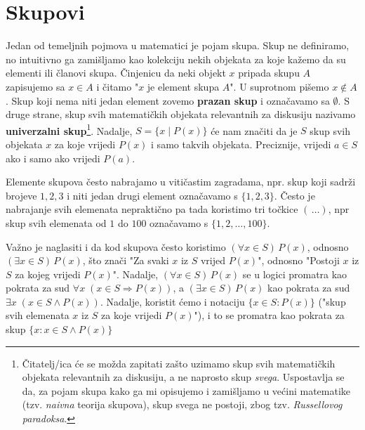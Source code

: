 \section{Skupovi}
Jedan od temeljnih pojmova u matematici je pojam skupa. Skup ne
definiramo, no intuitivno ga zamišljamo kao kolekciju nekih objekata
za koje kažemo da su elementi ili članovi skupa.
Činjenicu da neki objekt $x$ pripada skupu $A$ zapisujemo sa $x\in A$
i čitamo "$x$ je element skupa $A$". U suprotnom pišemo $x\notin A$.
Skup koji nema niti jedan element zovemo \textbf{prazan skup} i označavamo sa $\emptyset$. S druge strane, skup svih matematičkih objekata relevantnih za diskusiju nazivamo \textbf{univerzalni skup}\footnote{Čitatelj/ica će se možda zapitati zašto uzimamo skup svih matematičkih objekata relevantnih za diskusiju, a ne naprosto skup \textit{svega}. Uspostavlja se da, za pojam skupa kako ga mi opisujemo i zamišljamo u većini matematike (tzv. \textit{naivna} teorija skupova), skup svega ne postoji, zbog tzv. \textit{Russellovog paradoksa}.}. Nadalje, $S=\{x\; |\; P(x)\}$ će nam značiti da je $S$ skup svih objekata $x$ za koje vrijedi $P(x)$ i samo takvih objekata. Preciznije, vrijedi $a\in S$ ako i samo ako vrijedi $P(a)$. 

Elemente skupova često nabrajamo u vitičastim zagradama, npr. skup koji sadrži brojeve $1, 2, 3$ i niti jedan drugi element označavamo s $\{1, 2, 3\}$. Često je nabrajanje svih elemenata nepraktično pa tada koristimo tri točkice $(\,\dots)$, npr skup svih elemenata od $1$ do $100$ označavamo s $\{1, 2,\dots, 100\}$.

Važno je naglasiti i da kod skupova često koristimo $(\forall x\in S)\, P(x)$, odnosno $(\exists x\in S)\, P(x)$, što znači "Za svaki $x$ iz $S$ vrijed $P(x)$", odnosno "Postoji $x$ iz $S$ za kojeg vrijedi $P(x)$". Nadalje, $(\forall x\in S)\, P(x)$ se u logici promatra kao pokrata za sud $\forall x\; \left(x\in S\Rightarrow P(x)\right)$, a $(\exists x\in S)\, P(x)$ kao pokrata za sud $\exists x\; \left(x\in S\wedge P(x)\right)$. Nadalje, koristit ćemo i notaciju $\{x\in S : P(x)\}$ ("skup svih elemenata $x$ iz $S$ za koje vrijedi $P(x)$"), i to se promatra kao pokrata za skup $\{x : x\in S\wedge P(x)\}$

